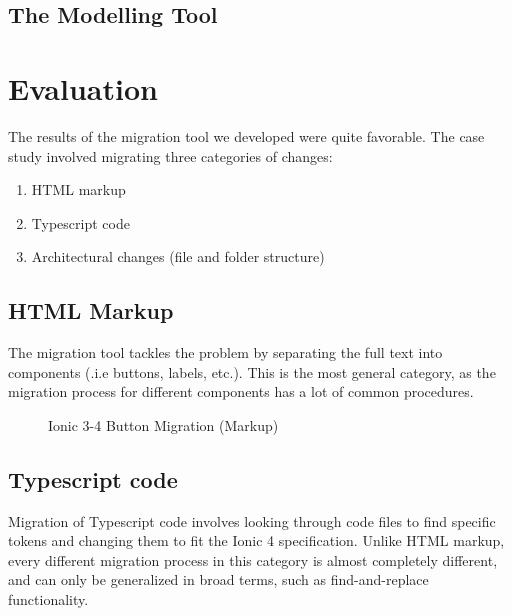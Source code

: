 \documentclass[conference]{IEEEtran}
\begin{document}
\subsection{The Modelling Tool}
\section{Evaluation}

The results of the migration tool we developed were quite favorable. The case study
involved migrating three categories of changes:
\begin{enumerate}
    \item HTML markup
    \item Typescript code
    \item Architectural changes (file and folder structure)
\end{enumerate}

\subsection{HTML Markup}
The migration tool tackles the problem by separating the full
text into components (.i.e buttons, labels, etc.). This is the most
general category, as the migration process for different components
has a lot of common procedures.

\begin{figure}
    \centering
    \qquad
    \caption{Ionic 3-4 Button Migration (Markup)}
    \label{fig:ionicButtonMigration}
\end{figure}

\subsection{Typescript code}
Migration of Typescript code involves looking through code files
to find specific tokens and changing them to fit the Ionic 4 specification.
Unlike HTML markup, every different migration process in this category is almost
completely different, and can only be generalized in broad terms, such as find-and-replace
functionality.
\end{document}
